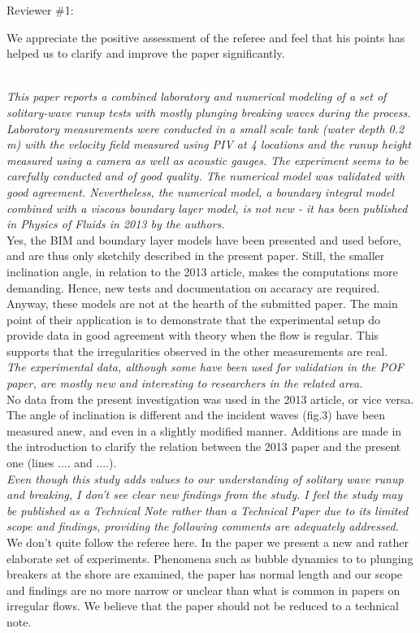 
\newcommand{\refpoint}[1]{\ \vspace{0.3cm}\\ {\em #1}\  \vspace{0.3cm}\\ }
\newcommand{\todo}[1]{\ \\ {\bf To do: #1}}
Reviewer \#1:

We appreciate the positive assessment of the referee and  feel that his points has helped us to clarify and improve the paper significantly.

\refpoint{This paper reports a combined laboratory and numerical modeling of a set of solitary-wave runup tests 
with mostly plunging breaking waves during the process.  Laboratory measurements were conducted in a small scale tank 
(water depth 0.2 m) with the velocity field measured using PIV at 4 locations and the runup height measured using a 
camera as well as acoustic gauges.  The experiment seems to be carefully conducted and of good quality.  The numerical
 model was validated with good agreement.  Nevertheless, the numerical model, a boundary integral model combined with a
 viscous boundary layer model, is not new - it has been published in Physics of Fluids in 2013 by the authors.}
Yes, the BIM and boundary layer models have been presented and used before, and are thus only sketchily described 
in the present paper. Still, the smaller inclination angle, in relation to the 2013 article, makes the 
computations more demanding. Hence, new tests and documentation on accaracy are required.\\
Anyway, these models are not at the hearth of the submitted paper.
The main point of their application  is to demonstrate that the experimental setup do
provide data in good agreement with theory when the flow is regular. This supports that the irregularities
observed in the other measurements are real.   
 \refpoint{The 
experimental data, although some have been used for validation in the POF paper, are mostly new and interesting to 
researchers in the related area.}
No data from the present investigation was used in the 2013 article, or vice versa. The angle of inclination
is different and the incident waves (fig.3) have been measured anew, and even in a slightly modified manner. 
Additions are made in the introduction to clarify the relation between the 2013 paper and the present one
(lines ....  and ....).
\refpoint{ Even though this study adds values to our understanding of solitary wave runup and 
breaking, I don't see clear new findings from the study.
 I feel the study may be published as a Technical Note rather than a Technical Paper due to its limited scope and 
findings, providing the following comments are adequately addressed.}
We don't quite follow the referee here. In the paper we present a new and rather elaborate set of experiments.
Phenomena such as bubble dynamics to to plunging breakers at the shore are examined, 
the paper has normal length and our scope and findings are no more narrow or unclear than what is common in 
papers on irregular flows.
We believe that the paper should not be reduced to a technical note. 

